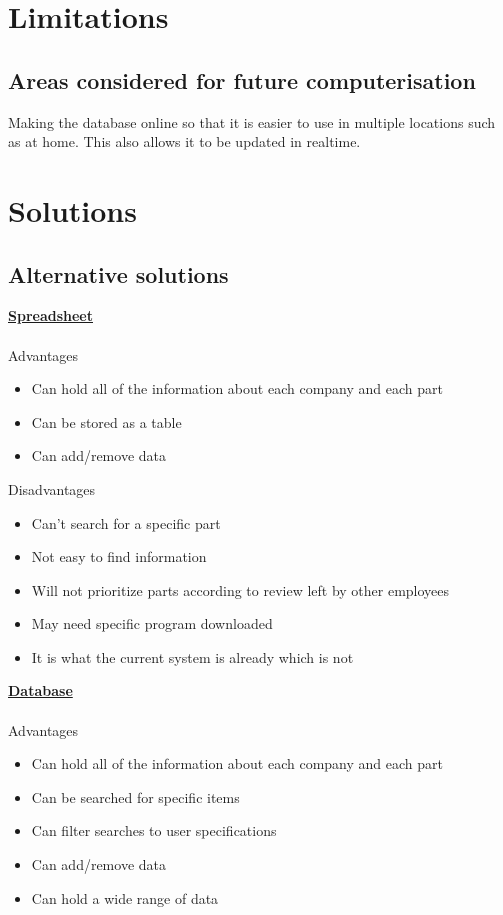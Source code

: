 \section{Limitations}

\subsection{Areas considered for future computerisation}
Making the database online so that it is easier to use in multiple locations such as at home. This also allows it to be updated in realtime.
\section{Solutions}

\subsection{Alternative solutions}
\textbf{\underline{Spreadsheet}}
\\
\\
{Advantages}
\begin{itemize}
	\item Can hold all of the information about each company and each part
	\item Can be stored as a table
	\item Can add/remove data
\end{itemize}
{Disadvantages}
\begin{itemize}
	\item Can't search for a specific part
	\item Not easy to find information
	\item Will not prioritize parts according to review left by other employees
	\item May need specific program downloaded
	\item It is what the current system is already which is not 
\end{itemize}
\textbf{\underline{Database}}
\\
\\
{Advantages}
\begin{itemize}
	\item Can hold all of the information about each company and each part
	\item Can be searched for specific items
	\item Can filter searches to user specifications 
	\item Can add/remove data
	\item Can hold a wide range of data
\end{itemize}
